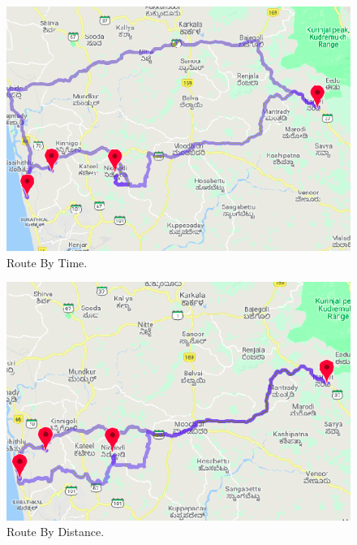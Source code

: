 \documentclass[conference]{IEEEtran}
\begin{document}
\begin{figure}[htbp]
\centerline{\includegraphics[width=\columnwidth]{distance.png}}
\caption{Route By Time.}
\label{fig5}
\end{figure}

\begin{figure}[htbp]
\centerline{\includegraphics[width=\columnwidth]{time.png}}
\caption{Route By Distance.}
\label{fig6}
\end{figure}
\end{document}
